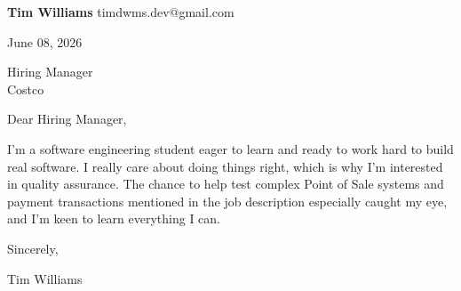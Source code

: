 \documentclass[12pt]{article}
\begin{document}
\textbf{Tim Williams} \hfill timdwms.dev@gmail.com

\vspace{1em}

June 08, 2026

\vspace{1em}

Hiring Manager \\
Costco

\vspace{1em}

Dear Hiring Manager,

I'm a software engineering student eager to learn and ready to work hard to build real software. I really care about doing things right, which is why I'm interested in quality assurance. The chance to help test complex Point of Sale systems and payment transactions mentioned in the job description especially caught my eye, and I'm keen to learn everything I can.

\vspace{1em}

Sincerely,

\vspace{2em}

Tim Williams
\end{document}
